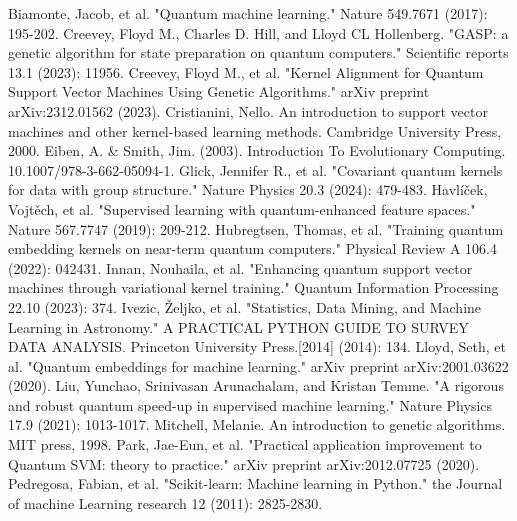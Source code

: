 \documentclass[12pt]{article}
\begin{document}
\begin{thebibliography}{9}

    Biamonte, Jacob, et al. "Quantum machine learning." Nature 549.7671 (2017): 195-202.
    Creevey, Floyd M., Charles D. Hill, and Lloyd CL Hollenberg. "GASP: a genetic algorithm for state preparation on quantum computers." Scientific reports 13.1 (2023): 11956.
    Creevey, Floyd M., et al. "Kernel Alignment for Quantum Support Vector Machines Using Genetic Algorithms." arXiv preprint arXiv:2312.01562 (2023).
    Cristianini, Nello. An introduction to support vector machines and other kernel-based learning methods. Cambridge University Press, 2000.    
    Eiben, A. \& Smith, Jim. (2003). Introduction To Evolutionary Computing. 10.1007/978-3-662-05094-1.     
    Glick, Jennifer R., et al. "Covariant quantum kernels for data with group structure." Nature Physics 20.3 (2024): 479-483.    
    Havlíček, Vojtěch, et al. "Supervised learning with quantum-enhanced feature spaces." Nature 567.7747 (2019): 209-212.    
    Hubregtsen, Thomas, et al. "Training quantum embedding kernels on near-term quantum computers." Physical Review A 106.4 (2022): 042431.    
    Innan, Nouhaila, et al. "Enhancing quantum support vector machines through variational kernel training." Quantum Information Processing 22.10 (2023): 374.    
    Ivezic, Željko, et al. "Statistics, Data Mining, and Machine Learning in Astronomy." A PRACTICAL PYTHON GUIDE TO SURVEY DATA ANALYSIS. Princeton University Press.[2014] (2014): 134.    
    Lloyd, Seth, et al. "Quantum embeddings for machine learning." arXiv preprint arXiv:2001.03622 (2020).    
    Liu, Yunchao, Srinivasan Arunachalam, and Kristan Temme. "A rigorous and robust quantum speed-up in supervised machine learning." Nature Physics 17.9 (2021): 1013-1017.    
    Mitchell, Melanie. An introduction to genetic algorithms. MIT press, 1998.    
    Park, Jae-Eun, et al. "Practical application improvement to Quantum SVM: theory to practice." arXiv preprint arXiv:2012.07725 (2020).    
    Pedregosa, Fabian, et al. "Scikit-learn: Machine learning in Python." the Journal of machine Learning research 12 (2011): 2825-2830.    

\end{thebibliography}
\end{document}
